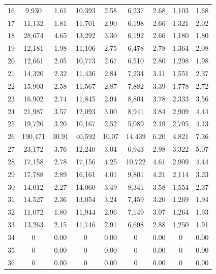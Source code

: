 \begin{table}[H]
{\begin{tabular}{c c c c c c c c c}
       16 & 9,930 &  1.61 & 10,393 &  2.58 & 6,237 &  2.68 & 1,103 &  1.68 \\ 
       17 & 11,132 &  1.81 & 11,701 &  2.90 & 6,198 &  2.66 & 1,321 &  2.02 \\ 
       18 & 28,674 &  4.65 & 13,292 &  3.30 & 6,192 &  2.66 & 1,180 &  1.80 \\ 
       19 & 12,181 &  1.98 & 11,106 &  2.75 & 6,478 &  2.78 & 1,364 &  2.08 \\ 
       20 & 12,661 &  2.05 & 10,773 &  2.67 & 6,510 &  2.80 & 1,298 &  1.98 \\ 
       21 & 14,320 &  2.32 & 11,436 &  2.84 & 7,234 &  3.11 & 1,551 &  2.37 \\ 
       22 & 15,903 &  2.58 & 11,567 &  2.87 & 7,882 &  3.39 & 1,778 &  2.72 \\ 
       23 & 16,902 &  2.74 & 11,845 &  2.94 & 8,804 &  3.78 & 2,333 &  3.56 \\ 
       24 & 21,987 &  3.57 & 12,093 &  3.00 & 8,941 &  3.84 & 2,909 &  4.44 \\ 
       25 & 19,726 &  3.20 & 10,167 &  2.52 & 5,089 &  2.19 & 2,705 &  4.13 \\ 
       26 & 190,471 & 30.91 & 40,592 & 10.07 & 14,439 &  6.20 & 4,821 &  7.36 \\ 
       27 & 23,172 &  3.76 & 12,240 &  3.04 & 6,943 &  2.98 & 3,322 &  5.07 \\ 
       28 & 17,158 &  2.78 & 17,156 &  4.25 & 10,722 &  4.61 & 2,909 &  4.44 \\ 
       29 & 17,788 &  2.89 & 16,161 &  4.01 & 9,801 &  4.21 & 2,114 &  3.23 \\ 
       30 & 14,012 &  2.27 & 14,060 &  3.49 & 8,341 &  3.58 & 1,554 &  2.37 \\ 
       31 & 14,527 &  2.36 & 13,054 &  3.24 & 7,459 &  3.20 & 1,269 &  1.94 \\ 
       32 & 11,072 &  1.80 & 11,944 &  2.96 & 7,149 &  3.07 & 1,264 &  1.93 \\ 
       33 & 13,263 &  2.15 & 11,746 &  2.91 & 6,698 &  2.88 & 1,250 &  1.91 \\ 
       34 & 0 &  0.00 & 0 &  0.00 & 0 &  0.00 & 0 &  0.00 \\ 
       35 & 0 &  0.00 & 0 &  0.00 & 0 &  0.00 & 0 &  0.00 \\ 
       36 & 0 &  0.00 & 0 &  0.00 & 0 &  0.00 & 0 &  0.00 \\ 
        \bottomrule
    \end{tabular}
    }
\end{table}

